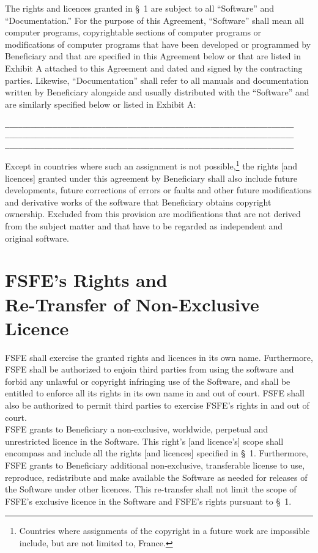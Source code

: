 The rights and licences granted in {\S}~1 are subject to all
``Software'' and ``Documentation.'' For the purpose of this Agreement,
``Software'' shall mean all computer programs, copyrightable sections
of computer programs or modifications of computer programs that have
been developed or programmed by Beneficiary and that are specified in
this Agreement below or that are listed in Exhibit A attached to this
Agreement and dated and signed by the contracting parties. Likewise,
``Documentation'' shall refer to all manuals and documentation written
by Beneficiary alongside and usually distributed with the ``Software''
and are similarly specified below or listed in Exhibit A:
\begin{alltt}
    __________________________________________________________________
    __________________________________________________________________
    __________________________________________________________________
\end{alltt}
Except in countries where such an assignment is not
possible,\footnote{Countries where assignments of the copyright in a
future work are impossible include, but are not limited to, France.}
the rights [and licences] granted under this agreement by Beneficiary
shall also include future developments, future corrections of errors
or faults and other future modifications and derivative works of the
software that Beneficiary obtains copyright ownership.  Excluded from
this provision are modifications that are not derived from the subject
matter and that have to be regarded as independent and original
software. 

\section{FSFE's Rights and \\Re-Transfer of Non-Exclusive Licence}
\A FSFE shall exercise the granted rights and licences in its
own name. Furthermore, FSFE shall be authorized to enjoin third
parties from using the software and forbid any unlawful or copyright
infringing use of the Software, and shall be entitled to enforce all
its rights in its own name in and out of court. FSFE shall also
be authorized to permit third parties to exercise FSFE's rights
in and out of court.\\ 

\A FSFE grants to Beneficiary a non-exclusive, worldwide, perpetual
and unrestricted licence in the Software. This right's [and licence's]
scope shall encompass and include all the rights [and licences]
specified in {\S}~1. Furthermore, FSFE grants to Beneficiary
additional non-exclusive, transferable license to use, reproduce,
redistribute and make available the Software as needed for releases of
the Software under other licences.  This re-transfer shall not limit
the scope of FSFE's exclusive licence in the Software and FSFE's
rights pursuant to {\S}~1.\\

